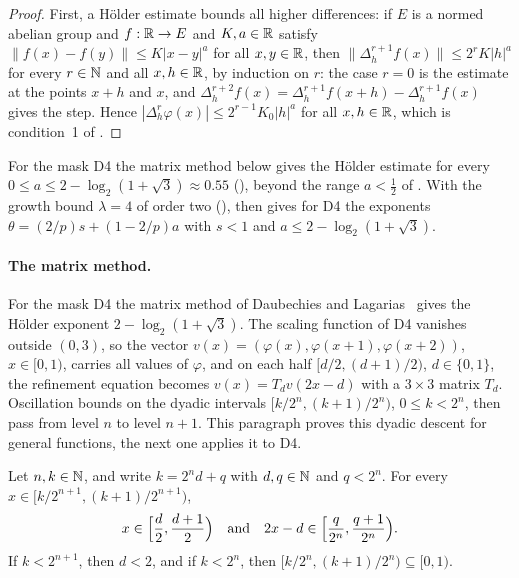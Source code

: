 \begin{proof}
\leanok
{}
First, a H\"older estimate bounds all higher differences: if $E$ is a normed abelian group and
$f : \mathbb{R} \to E$ and $K, a \in \mathbb{R}$ satisfy $\|f(x) - f(y)\| \leq K |x - y|^a$ for all
$x, y \in \mathbb{R}$, then $\|\Delta_h^{r+1} f(x)\| \leq 2^r K |h|^a$ for every $r \in \mathbb{N}$ and all
$x, h \in \mathbb{R}$, by induction on $r$: the case $r = 0$ is the estimate at the points $x + h$ and
$x$, and $\Delta_h^{r+2} f(x) = \Delta_h^{r+1} f(x + h) - \Delta_h^{r+1} f(x)$ gives the step.
Hence $|\Delta_h^r \varphi(x)| \leq 2^{r-1} K_0 |h|^a$ for all $x, h \in \mathbb{R}$, which is
condition~1 of .
\end{proof}

For the mask D4 the matrix method below gives the H\"older estimate for every
$0 \leq a \leq 2 - \log_2(1 + \sqrt 3) \approx 0.55$ (), beyond the
range $a < \frac12$ of . With the growth bound
$\lambda = 4$ of order two (), 
then gives for D4 the exponents $\theta = (2/p) s + (1 - 2/p) a$ with $s < 1$ and
$a \leq 2 - \log_2(1 + \sqrt 3)$.

\paragraph{The matrix method.}
For the mask D4 the matrix method of Daubechies and Lagarias~\cite{DaubechiesLagarias} gives
the H\"older exponent $2 - \log_2(1 + \sqrt 3)$. The scaling function of D4 vanishes outside
$(0, 3)$, so the vector $v(x) = (\varphi(x), \varphi(x + 1), \varphi(x + 2))$, $x \in [0, 1)$,
carries all values of $\varphi$, and on each half $[d/2, (d + 1)/2)$, $d \in \{0, 1\}$, the
refinement equation becomes $v(x) = T_d v(2x - d)$ with a $3 \times 3$ matrix $T_d$. Oscillation
bounds on the dyadic intervals $[k/2^n, (k+1)/2^n)$, $0 \leq k < 2^n$, then pass from level $n$
to level $n + 1$. This paragraph proves this dyadic descent for general functions, the next one
applies it to D4.

\begin{lemma}
\label{lem:daub-dyadic-intervals}
\leanok
Let $n, k \in \mathbb{N}$, and write $k = 2^n d + q$ with $d, q \in \mathbb{N}$ and $q < 2^n$. For every
$x \in [k/2^{n+1}, (k+1)/2^{n+1})$,
\[
  x \in \Bigl[\frac d2, \frac{d+1}{2}\Bigr) \quad\text{and}\quad
  2x - d \in \Bigl[\frac{q}{2^n}, \frac{q+1}{2^n}\Bigr) .
\]
If $k < 2^{n+1}$, then $d < 2$, and if $k < 2^n$, then $[k/2^n, (k+1)/2^n) \subseteq [0, 1)$.
\end{lemma}

